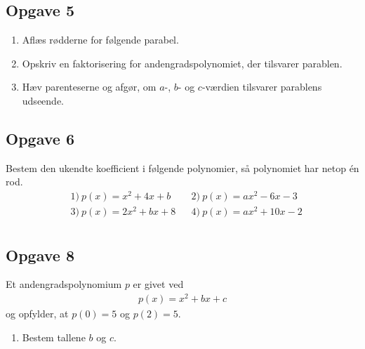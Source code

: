 \subsection*{Opgave 5}
\begin{enumerate}[label=\roman*)]
	\item Aflæs rødderne for følgende parabel.
	\item Opskriv en faktorisering for andengradspolynomiet, der tilsvarer parablen. 
	\item Hæv parenteserne og afgør, om $a$-, $b$- og $c$-værdien tilsvarer parablens udseende. 

\begin{center}
\end{center}


\end{enumerate}

\subsection*{Opgave 6}
Bestem den ukendte koefficient i følgende polynomier, så polynomiet har netop én rod. 
\begin{align*}
	&1) \ p(x) = x^2 + 4x + b &  &2) \ p(x) = ax^2 -6x - 3 \\
	&3) \ p(x) = 2x^2 + bx + 8 &  &4) \ p(x) = ax^2 +10x - 2   \\
\end{align*}


\subsection*{Opgave 8}
Et andengradspolynomium $p$ er givet ved
\begin{align*}
	p(x) = x^2 + bx +c 
\end{align*}
og opfylder, at $p(0) = 5$ og $p(2) = 5$.
\begin{enumerate}[label=\roman*)]
	\item Bestem tallene $b$ og $c$. 
\end{enumerate}

